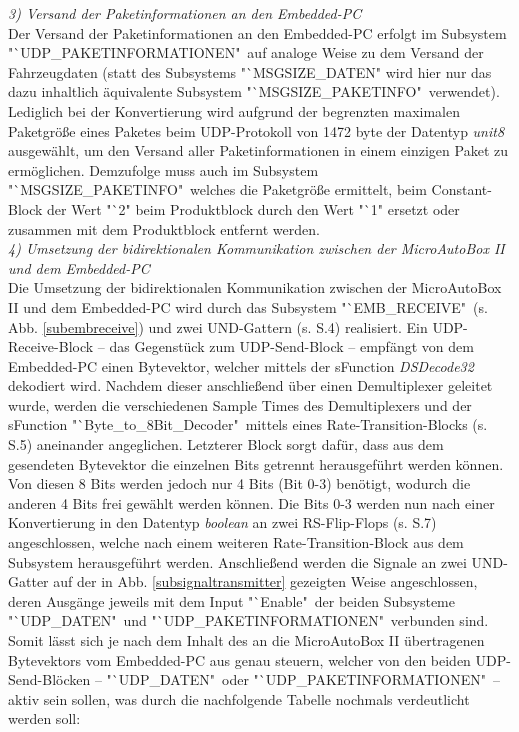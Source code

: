 \documentclass[fontsize = 12pt, paper = a4]{scrreprt}
\begin{document}
\vspace*{5mm}


\textit{3) Versand der Paketinformationen an den Embedded-PC} \\

Der Versand der Paketinformationen an den Embedded-PC erfolgt im Subsystem \\ "`UDP\_PAKETINFORMATIONEN"\ auf analoge Weise zu dem Versand der Fahrzeugdaten (statt des Subsystems "`MSGSIZE\_DATEN" wird hier nur das dazu inhaltlich äquivalente Subsystem "`MSGSIZE\_PAKETINFO"\ verwendet). Lediglich bei der Konvertierung wird aufgrund der begrenzten maximalen Paketgröße eines Paketes beim UDP-Protokoll von  1472 byte der Datentyp \textit{unit8} ausgewählt, um den Versand aller Paketinformationen in einem einzigen Paket zu ermöglichen. Demzufolge muss auch im Subsystem \\ "`MSGSIZE\_PAKETINFO"\, welches die Paketgröße ermittelt, beim Constant-Block der Wert  "`2" beim Produktblock durch den Wert  "`1" ersetzt oder zusammen mit dem Produktblock entfernt werden. \\




\textit{4) Umsetzung der bidirektionalen Kommunikation zwischen der MicroAutoBox II und dem Embedded-PC} \\

Die Umsetzung der bidirektionalen Kommunikation zwischen der MicroAutoBox II und dem Embedded-PC wird durch das Subsystem "`EMB\_RECEIVE"\ (s. Abb. \ref{subembreceive})  und zwei UND-Gattern (s. S.4) realisiert. Ein UDP-Receive-Block -- das Gegenstück zum UDP-Send-Block -- empfängt von dem Embedded-PC einen Bytevektor, welcher mittels der sFunction \textit{DSDecode32} dekodiert wird. Nachdem dieser anschließend über einen Demultiplexer geleitet wurde, werden die verschiedenen Sample Times des Demultiplexers und der sFunction "`Byte\_to\_8Bit\_Decoder"\ mittels eines Rate-Transition-Blocks (s. S.5) aneinander angeglichen. Letzterer Block sorgt dafür, dass aus dem gesendeten Bytevektor die einzelnen Bits getrennt herausgeführt werden können. Von diesen 8 Bits werden jedoch nur 4 Bits (Bit 0-3) benötigt, wodurch die anderen 4 Bits frei gewählt werden können. Die Bits 0-3 werden nun nach einer Konvertierung in den Datentyp \textit{boolean} an zwei RS-Flip-Flops (s. S.7) angeschlossen, welche nach einem weiteren Rate-Transition-Block aus dem Subsystem herausgeführt werden. Anschließend werden die Signale an zwei UND-Gatter auf der in Abb. \ref{subsignaltransmitter} gezeigten Weise angeschlossen, deren Ausgänge jeweils mit dem Input "`Enable"\ der beiden Subsysteme "`UDP\_DATEN"\ und "`UDP\_PAKETINFORMATIONEN"\ verbunden sind. Somit lässt sich je nach dem Inhalt des an die MicroAutoBox II übertragenen Bytevektors vom Embedded-PC aus genau steuern, welcher von den beiden UDP-Send-Blöcken -- "`UDP\_DATEN"\ oder "`UDP\_PAKETINFORMATIONEN"\ -- aktiv sein sollen, was durch die nachfolgende Tabelle nochmals verdeutlicht werden soll:
\end{document}
